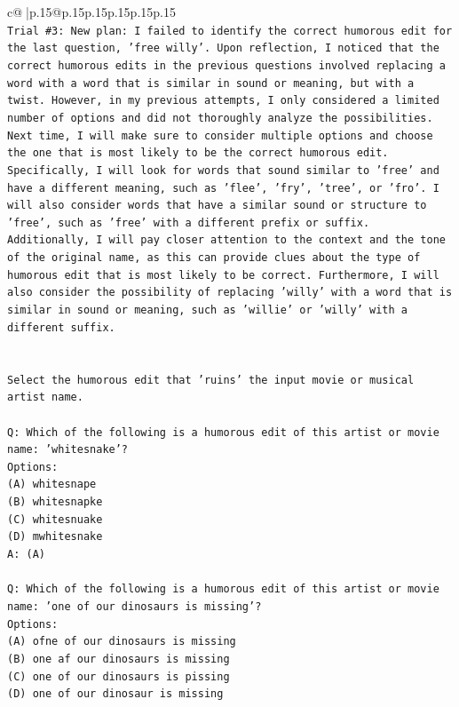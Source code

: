 \documentclass{article}
\begin{document}
{\begin{supertabular}{c@{$\;$}|p{.15\linewidth}@{}p{.15\linewidth}p{.15\linewidth}p{.15\linewidth}p{.15\linewidth}p{.15\linewidth}}
{{{\\ 
\texttt{Trial \#3: New plan: I failed to identify the correct humorous edit for the last question, 'free willy'. Upon reflection, I noticed that the correct humorous edits in the previous questions involved replacing a word with a word that is similar in sound or meaning, but with a twist. However, in my previous attempts, I only considered a limited number of options and did not thoroughly analyze the possibilities. Next time, I will make sure to consider multiple options and choose the one that is most likely to be the correct humorous edit. Specifically, I will look for words that sound similar to 'free' and have a different meaning, such as 'flee', 'fry', 'tree', or 'fro'. I will also consider words that have a similar sound or structure to 'free', such as 'free' with a different prefix or suffix. Additionally, I will pay closer attention to the context and the tone of the original name, as this can provide clues about the type of humorous edit that is most likely to be correct. Furthermore, I will also consider the possibility of replacing 'willy' with a word that is similar in sound or meaning, such as 'willie' or 'willy' with a different suffix.} \\
\\ 
\\ 
\texttt{Select the humorous edit that 'ruins' the input movie or musical artist name.} \\
\\ 
\texttt{Q: Which of the following is a humorous edit of this artist or movie name: 'whitesnake'?} \\
\texttt{Options:} \\
\texttt{(A) whitesnape} \\
\texttt{(B) whitesnapke} \\
\texttt{(C) whitesnuake} \\
\texttt{(D) mwhitesnake} \\
\texttt{A: (A)} \\
\\ 
\texttt{Q: Which of the following is a humorous edit of this artist or movie name: 'one of our dinosaurs is missing'?} \\
\texttt{Options:} \\
\texttt{(A) ofne of our dinosaurs is missing} \\
\texttt{(B) one af our dinosaurs is missing} \\
\texttt{(C) one of our dinosaurs is pissing} \\
\texttt{(D) one of our dinosaur is missing} \\
}}}
\end{supertabular}}
\end{document}
